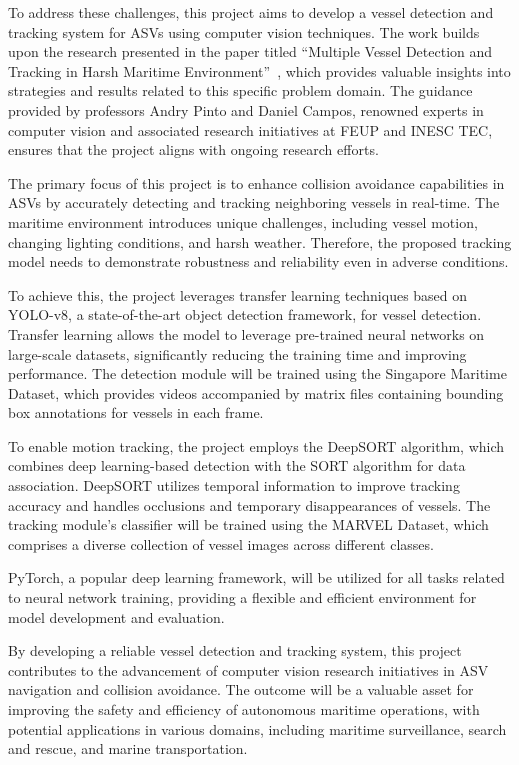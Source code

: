 \documentclass[a4paper,12pt]{article}
\begin{document}
\begin{multicols}{2}
To address these challenges, this project aims to develop a vessel detection and tracking system for ASVs using computer vision techniques.
The work builds upon the research presented in the paper titled ``Multiple Vessel Detection and Tracking in Harsh Maritime Environment''~\cite{MVDTHME}, which provides valuable insights into strategies and results related to this specific problem domain.
The guidance provided by professors Andry Pinto and Daniel Campos, renowned experts in computer vision and associated research initiatives at FEUP and INESC TEC, ensures that the project aligns with ongoing research efforts.

The primary focus of this project is to enhance collision avoidance capabilities in ASVs by accurately detecting and tracking neighboring vessels in real-time.
The maritime environment introduces unique challenges, including vessel motion, changing lighting conditions, and harsh weather.
Therefore, the proposed tracking model needs to demonstrate robustness and reliability even in adverse conditions.

To achieve this, the project leverages transfer learning techniques based on YOLO-v8, a state-of-the-art object detection framework, for vessel detection.
Transfer learning allows the model to leverage pre-trained neural networks on large-scale datasets, significantly reducing the training time and improving performance.
The detection module will be trained using the Singapore Maritime Dataset, which provides videos accompanied by matrix files containing bounding box annotations for vessels in each frame.

To enable motion tracking, the project employs the DeepSORT algorithm, which combines deep learning-based detection with the SORT algorithm for data association.
DeepSORT utilizes temporal information to improve tracking accuracy and handles occlusions and temporary disappearances of vessels.
The tracking module's classifier will be trained using the MARVEL Dataset, which comprises a diverse collection of vessel images across different classes.

PyTorch, a popular deep learning framework, will be utilized for all tasks related to neural network training, providing a flexible and efficient environment for model development and evaluation.

By developing a reliable vessel detection and tracking system, this project contributes to the advancement of computer vision research initiatives in ASV navigation and collision avoidance.
The outcome will be a valuable asset for improving the safety and efficiency of autonomous maritime operations, with potential applications in various domains, including maritime surveillance, search and rescue, and marine transportation.


\end{multicols}
\end{document}
